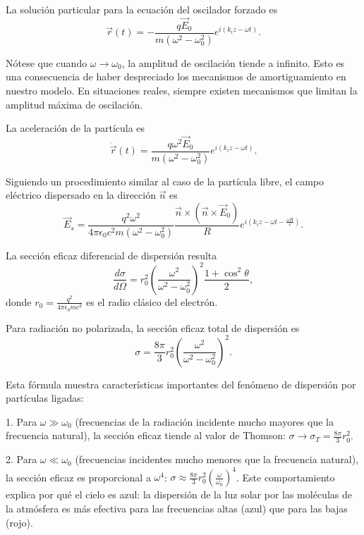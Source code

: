 \documentclass[12pt,a4paper]{book}
\begin{document}
La solución particular para la ecuación del oscilador forzado es
\begin{equation}
\vec{r}(t) = -\frac{q\vec{E}_0}{m(\omega^2-\omega_0^2)}e^{i(k_iz-\omega t)}.
\end{equation}

Nótese que cuando $\omega \to \omega_0$, la amplitud de oscilación tiende a infinito. Esto es una consecuencia de haber despreciado los mecanismos de amortiguamiento en nuestro modelo. En situaciones reales, siempre existen mecanismos que limitan la amplitud máxima de oscilación.

La aceleración de la partícula es
\begin{equation}
\ddot{\vec{r}}(t) = \frac{q\omega^2\vec{E}_0}{m(\omega^2-\omega_0^2)}e^{i(k_iz-\omega t)}.
\end{equation}

Siguiendo un procedimiento similar al caso de la partícula libre, el campo eléctrico dispersado en la dirección $\vec{n}$ es
\begin{equation}
\vec{E}_s = \frac{q^2\omega^2}{4\pi\epsilon_0c^2m(\omega^2-\omega_0^2)}\frac{\vec{n} \times (\vec{n} \times \vec{E}_0)}{R}e^{i(k_iz-\omega t-\frac{\omega R}{c})}.
\end{equation}

La sección eficaz diferencial de dispersión resulta
\begin{equation}
\frac{d\sigma}{d\Omega} = r_0^2\left(\frac{\omega^2}{\omega^2-\omega_0^2}\right)^2\frac{1 + \cos^2\theta}{2},
\end{equation}
donde $r_0 = \frac{q^2}{4\pi\epsilon_0mc^2}$ es el radio clásico del electrón.

Para radiación no polarizada, la sección eficaz total de dispersión es
\begin{equation}
\sigma = \frac{8\pi}{3}r_0^2\left(\frac{\omega^2}{\omega^2-\omega_0^2}\right)^2.
\end{equation}

Esta fórmula muestra características importantes del fenómeno de dispersión por partículas ligadas:

1. Para $\omega \gg \omega_0$ (frecuencias de la radiación incidente mucho mayores que la frecuencia natural), la sección eficaz tiende al valor de Thomson: $\sigma \to \sigma_T = \frac{8\pi}{3}r_0^2$.

2. Para $\omega \ll \omega_0$ (frecuencias incidentes mucho menores que la frecuencia natural), la sección eficaz es proporcional a $\omega^4$: $\sigma \approx \frac{8\pi}{3}r_0^2\left(\frac{\omega}{\omega_0}\right)^4$. Este comportamiento explica por qué el cielo es azul: la dispersión de la luz solar por las moléculas de la atmósfera es más efectiva para las frecuencias altas (azul) que para las bajas (rojo).
\end{document}
